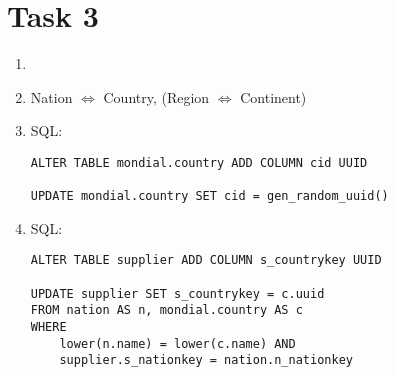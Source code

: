 \documentclass{article}
\begin{document}
	\section*{Task 3}
	\begin{enumerate}[label=(\alph*)]
		\item 
		\item Nation $\Leftrightarrow$ Country, (Region $\Leftrightarrow$ Continent)
		\item SQL:
		\begin{lstlisting}[tabsize=2]
ALTER TABLE mondial.country ADD COLUMN cid UUID

UPDATE mondial.country SET cid = gen_random_uuid()
		\end{lstlisting}
		\item SQL:
		\begin{lstlisting}[tabsize=2]
ALTER TABLE supplier ADD COLUMN s_countrykey UUID

UPDATE supplier SET s_countrykey = c.uuid
FROM nation AS n, mondial.country AS c
WHERE 
	lower(n.name) = lower(c.name) AND
	supplier.s_nationkey = nation.n_nationkey
		\end{lstlisting}
	\end{enumerate}
\end{document}
